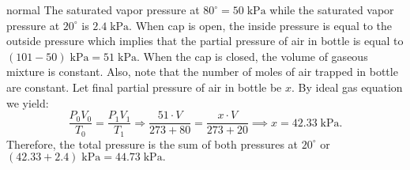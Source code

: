 \begin{solution}{normal}
The saturated vapor pressure at $80^{\circ} = 50\;\mathrm{kPa}$ while the saturated vapor pressure at $20^{\circ}$ is  $2.4\;\mathrm{kPa}$. When cap is open, the inside pressure is equal to the outside pressure which implies that the partial pressure of air in bottle is equal to  $(101-50)\;\mathrm{kPa} = 51\;\mathrm{kPa}$. When the cap is closed, the volume of gaseous mixture is constant. Also, note that the number of moles of air trapped in bottle are constant. Let final partial pressure of air in bottle be $x$. By ideal gas equation we yield: 
\[\frac {P_0V_0}{T_0} = \frac {P_1V_1}{T_1}\Rightarrow \frac {51\cdot V}{273 + 80} = \frac {x\cdot V}{273 + 20}\implies x = 42.33\;\mathrm{kPa}.\]
Therefore, the total pressure is the sum of both pressures at $20^{\circ}$ or $(42.33 + 2.4)\;\mathrm{kPa}= 44.73\;\mathrm{kPa}.$
\end{solution}